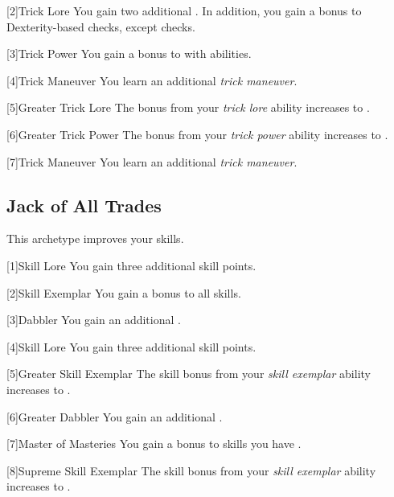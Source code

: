         [2]{Trick Lore} You gain two additional .
        In addition, you gain a  bonus to Dexterity-based checks, except  checks.

        [3]{Trick Power} You gain a  bonus to  with  abilities.

        [4]{Trick Maneuver}
        You learn an additional \textit{trick maneuver}.

        [5]{Greater Trick Lore} The bonus from your \textit{trick lore} ability increases to .

        [6]{Greater Trick Power} The bonus from your \textit{trick power} ability increases to .

        [7]{Trick Maneuver}
        You learn an additional \textit{trick maneuver}.

    \subsection{Jack of All Trades}
        This archetype improves your skills.

        [1]{Skill Lore} You gain three additional skill points.

        [2]{Skill Exemplar} You gain a  bonus to all skills.

        [3]{Dabbler} You gain an additional .

        [4]{Skill Lore} You gain three additional skill points.

        [5]{Greater Skill Exemplar} The skill bonus from your \textit{skill exemplar} ability increases to .

        [6]{Greater Dabbler} You gain an additional .

        [7]{Master of Masteries} You gain a  bonus to skills you have .

        [8]{Supreme Skill Exemplar} The skill bonus from your \textit{skill exemplar} ability increases to .


